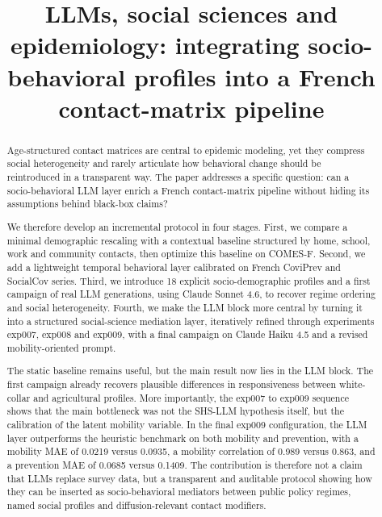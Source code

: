 \documentclass[ROIA,Unicode]{cedram}
\title[LLMs, social sciences and epidemiology]{LLMs, social sciences and epidemiology: integrating socio-behavioral profiles into a French contact-matrix pipeline}
\author{\firstname{Martin} \lastname{Collins}}
\begin{document}

\begin{abstract}
Age-structured contact matrices are central to epidemic modeling, yet they compress social heterogeneity and rarely articulate how behavioral change should be reintroduced in a transparent way. The paper addresses a specific question: can a socio-behavioral LLM layer enrich a French contact-matrix pipeline without hiding its assumptions behind black-box claims?

We therefore develop an incremental protocol in four stages. First, we compare a minimal demographic rescaling with a contextual baseline structured by home, school, work and community contacts, then optimize this baseline on COMES-F. Second, we add a lightweight temporal behavioral layer calibrated on French CoviPrev and SocialCov series. Third, we introduce 18 explicit socio-demographic profiles and a first campaign of real LLM generations, using Claude Sonnet 4.6, to recover regime ordering and social heterogeneity. Fourth, we make the LLM block more central by turning it into a structured social-science mediation layer, iteratively refined through experiments exp007, exp008 and exp009, with a final campaign on Claude Haiku 4.5 and a revised mobility-oriented prompt.

The static baseline remains useful, but the main result now lies in the LLM block. The first campaign already recovers plausible differences in responsiveness between white-collar and agricultural profiles. More importantly, the exp007 to exp009 sequence shows that the main bottleneck was not the SHS-LLM hypothesis itself, but the calibration of the latent mobility variable. In the final exp009 configuration, the LLM layer outperforms the heuristic benchmark on both mobility and prevention, with a mobility MAE of 0.0219 versus 0.0935, a mobility correlation of 0.989 versus 0.863, and a prevention MAE of 0.0685 versus 0.1409. The contribution is therefore not a claim that LLMs replace survey data, but a transparent and auditable protocol showing how they can be inserted as socio-behavioral mediators between public policy regimes, named social profiles and diffusion-relevant contact modifiers.
\end{abstract}
\end{document}
